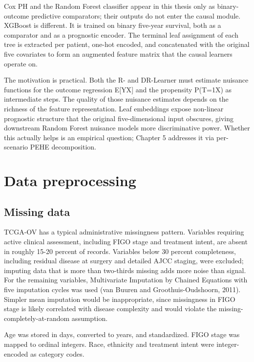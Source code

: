 Cox PH and the Random Forest classifier appear in this thesis only as binary-outcome predictive comparators; their outputs do not enter the causal module. XGBoost is different. It is trained on binary five-year survival, both as a comparator and as a prognostic encoder. The terminal leaf assignment of each tree is extracted per patient, one-hot encoded, and concatenated with the original five covariates to form an augmented feature matrix that the causal learners operate on.

The motivation is practical. Both the R- and DR-Learner must estimate nuisance functions for the outcome regression E{[}Y\textbar X{]} and the propensity P(T=1\textbar X) as intermediate steps. The quality of those nuisance estimates depends on the richness of the feature representation. Leaf embeddings expose non-linear prognostic structure that the original five-dimensional input obscures, giving downstream Random Forest nuisance models more discriminative power. Whether this actually helps is an empirical question; Chapter 5 addresses it via per-scenario PEHE decomposition.

\section{Data preprocessing}\label{data-preprocessing}

\subsection{Missing data}\label{missing-data}

TCGA-OV has a typical administrative missingness pattern. Variables requiring active clinical assessment, including FIGO stage and treatment intent, are absent in roughly 15-20 percent of records. Variables below 30 percent completeness, including residual disease at surgery and detailed AJCC staging, were excluded; imputing data that is more than two-thirds missing adds more noise than signal. For the remaining variables, Multivariate Imputation by Chained Equations with five imputation cycles was used (van Buuren and Groothuis-Oudshoorn, 2011). Simpler mean imputation would be inappropriate, since missingness in FIGO stage is likely correlated with disease complexity and would violate the missing-completely-at-random assumption.

Age was stored in days, converted to years, and standardized. FIGO stage was mapped to ordinal integers. Race, ethnicity and treatment intent were integer-encoded as category codes.

